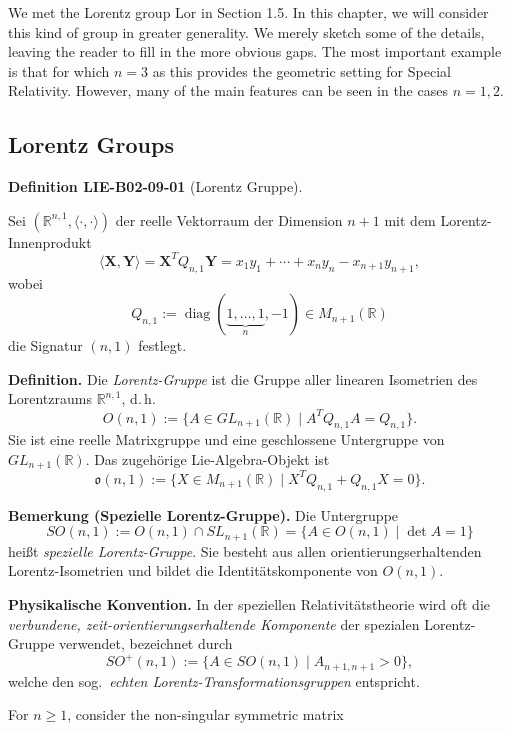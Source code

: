 \documentclass[10pt, letterpaper]{article}
\newcommand{\CustomHeading}[3]{%
  \par\medskip\noindent%
  \textbf{#1 #2} \textnormal{(#3)}.\enskip%
}
\newenvironment{DEF}[2]{\begin{unitbox}\CustomHeading{Definition}{#1}{#2}}{\end{unitbox}}
\begin{document}
We met the Lorentz group Lor in Section 1.5. In this chapter, we will consider this kind of group in greater generality. We merely sketch some of the details, leaving the reader to fill in the more obvious gaps. The most important example is that for which $n=3$ as this provides the geometric setting for Special Relativity. However, many of the main features can be seen in the cases $n=1,2$.

\subsection{Lorentz Groups}




\begin{DEF}{LIE-B02-09-01}{Lorentz Gruppe}
Sei \((\mathbb{R}^{n,1},\langle\cdot,\cdot\rangle)\) der reelle Vektorraum der Dimension
\(n+1\) mit dem Lorentz-Innenprodukt
\[
\langle \mathbf{X},\mathbf{Y}\rangle
= \mathbf{X}^{T} Q_{n,1} \mathbf{Y}
= x_1y_1 + \cdots + x_ny_n - x_{n+1}y_{n+1},
\]
wobei
\[
Q_{n,1} := \operatorname{diag}(\underbrace{1,\ldots,1}_{n},-1)
\in M_{n+1}(\mathbb{R})
\]
die Signatur \((n,1)\) festlegt.

\textbf{Definition.}
Die \emph{Lorentz-Gruppe} ist die Gruppe aller linearen Isometrien des
Lorentzraums \(\mathbb{R}^{n,1}\), d.\,h.
\[
O(n,1)
:= \{A\in GL_{n+1}(\mathbb{R}) \mid A^{T} Q_{n,1} A = Q_{n,1}\}.
\]
Sie ist eine reelle Matrixgruppe und eine geschlossene Untergruppe von
\(GL_{n+1}(\mathbb{R})\). Das zugehörige Lie-Algebra-Objekt ist
\[
\mathfrak{o}(n,1)
:= \{X\in M_{n+1}(\mathbb{R}) \mid X^{T} Q_{n,1} + Q_{n,1} X = 0\}.
\]

\textbf{Bemerkung (Spezielle Lorentz-Gruppe).}
Die Untergruppe
\[
SO(n,1)
:= O(n,1)\cap SL_{n+1}(\mathbb{R})
= \{A\in O(n,1)\mid \det A = 1\}
\]
heißt \emph{spezielle Lorentz-Gruppe}.  
Sie besteht aus allen orientierungserhaltenden Lorentz-Isometrien
und bildet die Identitätskomponente von \(O(n,1)\).

\textbf{Physikalische Konvention.}
In der speziellen Relativitätstheorie wird oft die
\emph{verbundene, zeit-orientierungserhaltende Komponente} der
spezialen Lorentz-Gruppe verwendet, bezeichnet durch
\[
SO^{+}(n,1)
:= \{A\in SO(n,1)\mid A_{n+1,n+1}>0\},
\]
welche den sog.\ \emph{echten Lorentz-Transformationsgruppen}
entspricht.
\end{DEF}





For $n \geqslant 1$, consider the non-singular symmetric matrix
\end{document}
